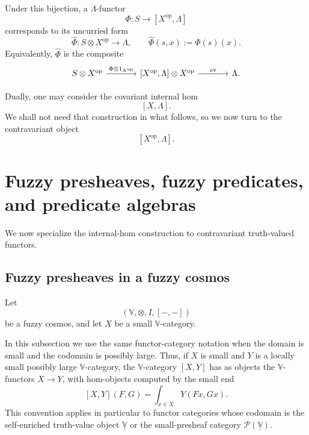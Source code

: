 Under this bijection, a \(\Lambda\)-functor
\[
    \Phi:S\to [X^{\mathrm{op}},\Lambda]
\]
corresponds to its uncurried form
\[
    \widehat{\Phi}:S\otimes X^{\mathrm{op}}\to\Lambda,
    \qquad
    \widehat{\Phi}(s,x):=\Phi(s)(x).
\]
Equivalently, \(\widehat{\Phi}\) is the composite
\[
    \begin{tikzcd}[column sep=large,row sep=large]
        S\otimes X^{\mathrm{op}}
            \arrow[r,"\Phi\otimes 1_{X^{\mathrm{op}}}"]
        &
        \left[X^{\mathrm{op}},\Lambda\right]\otimes X^{\mathrm{op}}
            \arrow[r,"\operatorname{ev}"]
        &
        \Lambda .
    \end{tikzcd}
\]

\begin{remark}
\label{rem:dual-covariant-construction}
    Dually, one may consider the covariant internal hom
    \[
        [X,\Lambda].
    \]
    We shall not need that construction in what follows, so we now turn to the contravariant object
    \[
        [X^{\mathrm{op}},\Lambda].
    \]
\end{remark}

\section{Fuzzy presheaves, fuzzy predicates, and predicate algebras}
\label{sec:fuzzy-presheaves-and-fuzzy-predicate-algebras}

We now specialize the internal-hom construction to contravariant truth-valued functors.

\subsection{Fuzzy presheaves in a fuzzy cosmos}
\label{subsec:fuzzy-presheaves-in-a-fuzzy-cosmos}

Let
\[
    (\mathbb V,\otimes,I,[-,-])
\]
be a fuzzy cosmos, and let \(X\) be a small \(\mathbb V\)-category.

In this subsection we use the same functor-category notation when the domain is small and the codomain is possibly large. Thus, if \(X\) is small and \(Y\) is a locally small possibly large \(\mathbb V\)-category, the \(\mathbb V\)-category \([X,Y]\) has as objects the \(\mathbb V\)-functors \(X\to Y\), with hom-objects computed by the small end
\[
    [X,Y](F,G)
    =
    \int_{x\in X}Y(Fx,Gx).
\]
This convention applies in particular to functor categories whose codomain is the self-enriched truth-value object \(\underline{\mathbb V}\) or the small-presheaf category \(\mathcal P(\underline{\mathbb V})\).

